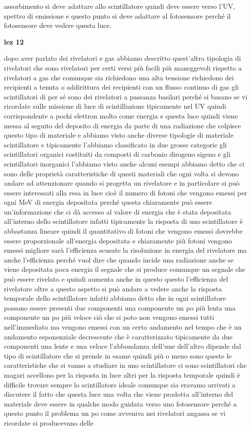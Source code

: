 {assorbimento si deve adattare allo scintillatore quindi deve essere verso l'UV, spettro di emissione e questo punto si deve adattare al fotosensore perché il fotosensore deve vedere questa luce. 


\textbf{lez 12}

dopo aver parlato dei rivelatori e gas abbiamo descritto quest'altra tipologia di rivelatori che sono rivelatori per certi versi più facili più maneggevoli rispetto a rivelatori a gas che comunque sia richiedono una alta tensione richiedono dei recipienti a tenuta o addirittura dei recipienti con un flusso continuo di gas gli scintillatori di per sé sono dei rivelatori a passanza basilari perché si basano se vi ricordate sulle missione di luce di scintillazione tipicamente nel UV quindi corrispondente a pochi elettron molto come energia e questa luce quindi viene messa al seguito del deposito di energia da parte di una radiazione che colpisce questo tipo di materiale e abbiamo visto anche diverse tipologie di materiale scintillatore e tipicamente l'abbiamo classificato in due grosse categorie gli scintillatori organici costituiti da composti di carbonio dirogeno sigeno e gli scintillatori inorganici l'abbiamo visto anche alcuni esempi abbiamo detto che ci sono delle proprietà caratteristiche di questi materiali che ogni volta si devono andare ad attenzionare quando si progetta un rivelatore e in particolare si può essere interessati alla resa in luce cioè il numero di fotoni che vengono emessi per ogni MeV di energia depositata perché questa chiaramente può essere un'informazione che ci dà accesso al valore di energia che è stata depositata all'interno dello scintillatore infatti tipicamente la risposta di uno scintillatore è abbastanza lineare quindi il quantitativo di fotoni che vengono emessi dovrebbe essere proporzionale all'energia depositata e chiaramente più fotoni vengono emessi migliore sarà l'efficienza scusate la risoluzione in energia del rivelatore ma anche l'efficienza perché vuol dire che quando incide una radiazione anche se viene depositata poca energia il segnale che si produce comunque un segnale che può essere rivelato e quindi aumenta anche in questo questo l'efficienza del rivelatore oltre a questo aspetto si può andare a vedere anche la risposta temporale dello scintillatore infatti abbiamo detto che in ogni scintillatore possono essere presenti due componenti una componente un po più lenta una componente un po più veloce ciò che si poto non vengono emessi tutti nell'immediato ma vengono emessi con un certo andamento nel tempo che è un andamento esponenziale decrescente che è caratterizzato tipicamente da due componenti una lente e una veloce l'abbondanza dell'une dell'altro dipende dal tipo di scintillatore che si prende in esame quindi più o meno sono queste le caratteristiche che si vanno a studiare in uno scintillatore ci sono scintillatori che magari accellono per la risposta in luce altri per la risposta temporale quindi è difficile trovare sempre lo scintillatore ideale comunque sia eravamo arrivati a discutere il fatto che questa luce una volta che viene prodotta all'interno del materiale deve essere in qualche modo guidata verso uno fotosensore perché a questo punto il problema un po come avveniva nei rivelatori angassa se vi ricordate si producevano delle 

}
